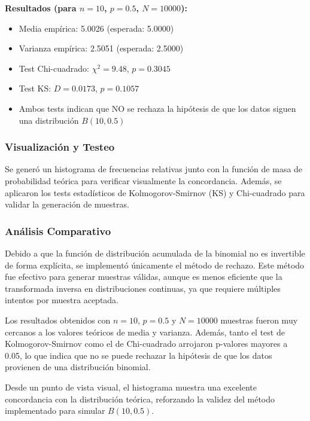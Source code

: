 \documentclass{article}
\begin{document}
\textbf{Resultados (para $n=10$, $p=0.5$, $N=10000$):}
\begin{itemize}
    \item Media empírica: 5.0026 \hfill (esperada: 5.0000)
    \item Varianza empírica: 2.5051 \hfill (esperada: 2.5000)
    \item Test Chi-cuadrado: $\chi^2 = 9.48$, $p = 0.3045$
    \item Test KS: $D = 0.0173$, $p = 0.1057$
    \item Ambos tests indican que NO se rechaza la hipótesis de que los datos siguen una distribución $B(10, 0.5)$
\end{itemize}

\vspace{0.5em}
\subsubsection{Visualización y Testeo}
Se generó un histograma de frecuencias relativas junto con la función de masa de probabilidad teórica para verificar visualmente la concordancia. Además, se aplicaron los tests estadísticos de Kolmogorov-Smirnov (KS) y Chi-cuadrado para validar la generación de muestras.

\vspace{0.5em}
\subsubsection{Análisis Comparativo}
Debido a que la función de distribución acumulada de la binomial no es invertible de forma explícita, se implementó únicamente el método de rechazo. Este método fue efectivo para generar muestras válidas, aunque es menos eficiente que la transformada inversa en distribuciones continuas, ya que requiere múltiples intentos por muestra aceptada.

Los resultados obtenidos con $n=10$, $p=0.5$ y $N=10000$ muestras fueron muy cercanos a los valores teóricos de media y varianza. Además, tanto el test de Kolmogorov-Smirnov como el de Chi-cuadrado arrojaron p-valores mayores a 0.05, lo que indica que no se puede rechazar la hipótesis de que los datos provienen de una distribución binomial.

Desde un punto de vista visual, el histograma muestra una excelente concordancia con la distribución teórica, reforzando la validez del método implementado para simular $B(10, 0.5)$.
\end{document}
